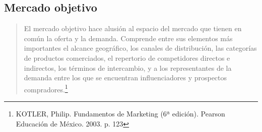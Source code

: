 \subsection{Mercado objetivo}
\begin{quote}
El mercado objetivo hace alusi\'on al espacio del mercado que tienen en com\'un la oferta y la demanda. Comprende entre sus elementos m\'as importantes el alcance geogr\'afico, los canales de distribuci\'on, las categor\'ias de productos comerciados, el repertorio de competidores directos e indirectos, los t\'erminos de intercambio, y a los representantes de la demanda entre los que se encuentran influenciadores y prospectos compradores.\footnote{KOTLER, Philip.  Fundamentos de Marketing (6ª edici\'on). Pearson Educaci\'on de M\'exico. 2003. p. 123}
\end{quote}
\pagebreak